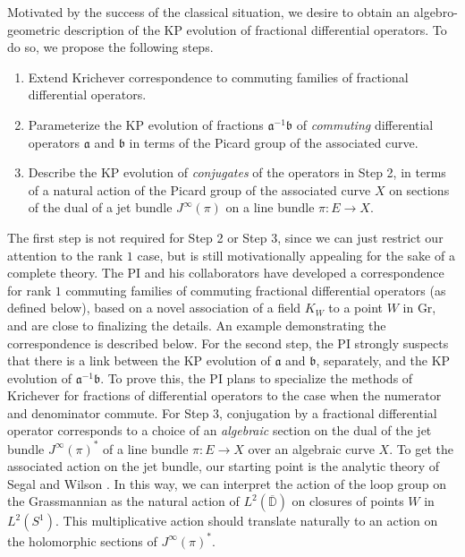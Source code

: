 \documentclass[11pt,letterpaper]{article}
\theoremstyle{definition}
\newcommand{\Gr}{\text{Gr}}
\newcommand{\ol}[1]{\overline{#1}}
\begin{document}
Motivated by the success of the classical situation, we desire to obtain an algebro-geometric description of the KP evolution of fractional differential operators.  To do so, we propose the following steps.
\begin{enumerate}[(Step 1):]
\item
Extend Krichever correspondence to commuting families of fractional differential operators.
\item 
Parameterize the KP evolution of fractions $\mathfrak a^{-1}\mathfrak b$ of \emph{commuting} differential operators $\mathfrak a$ and $\mathfrak b$ in terms of the Picard group of the associated curve.
\item
Describe the KP evolution of \emph{conjugates} of the operators in Step 2, in terms of a natural action of the Picard group of the associated curve $X$ on sections of the dual of a jet bundle $J^\infty(\pi)$ on a line bundle $\pi:E\rightarrow X$.
\end{enumerate}
The first step is not required for Step 2 or Step 3, since we can just restrict our attention to the rank $1$ case, but is still motivationally appealing for the sake of a complete theory.
The PI and his collaborators have developed a correspondence for rank $1$ commuting families of commuting fractional differential operators (as defined below), based on a novel association of a field $K_W$ to a point $W$ in $\Gr$, and are close to finalizing the details.  An example demonstrating the correspondence is described below.
For the second step, the PI strongly suspects that there is a link between the KP evolution of $\mathfrak a$ and $\mathfrak b$, separately, and the KP evolution of $\mathfrak a^{-1}\mathfrak b$.  To prove this, the PI plans to specialize the methods of Krichever for fractions of differential operators \cite{krichever1995} to the case when the numerator and denominator commute.
For Step 3, conjugation by a fractional differential operator corresponds to a choice of an \emph{algebraic} section on the dual of the jet bundle $J^\infty(\pi)^*$ of a line bundle $\pi: E\rightarrow X$ over an algebraic curve $X$.
To get the associated action on the jet bundle, our starting point is the analytic theory of Segal and Wilson \cite{SW}.
In this way, we can interpret the action of the loop group on the Grassmannian as the natural action of $L^2(\ol{\mathbb D})$ on closures of points $W$ in $L^2(S^1)$.
This multiplicative action should translate naturally to an action on the holomorphic sections of $J^\infty(\pi)^*$.
\end{document}
